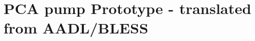 
\cleardoublepage

\chapter{PCA pump Prototype - translated from AADL/BLESS}
\label{Appendix:pca_prototype}

